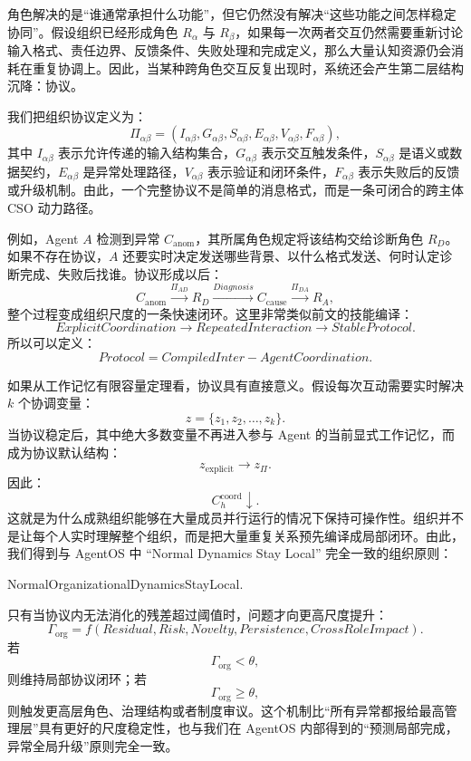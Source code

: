 角色解决的是“谁通常承担什么功能”，但它仍然没有解决“这些功能之间怎样稳定协同”。假设组织已经形成角色 $R_\alpha$ 与 $R_\beta$，如果每一次两者交互仍然需要重新讨论输入格式、责任边界、反馈条件、失败处理和完成定义，那么大量认知资源仍会消耗在重复协调上。因此，当某种跨角色交互反复出现时，系统还会产生第二层结构沉降：协议。

我们把组织协议定义为：
\[
\Pi_{\alpha\beta}
=
\left(
I_{\alpha\beta},
G_{\alpha\beta},
S_{\alpha\beta},
E_{\alpha\beta},
V_{\alpha\beta},
F_{\alpha\beta}
\right),
\]
其中 $I_{\alpha\beta}$ 表示允许传递的输入结构集合，$G_{\alpha\beta}$ 表示交互触发条件，$S_{\alpha\beta}$ 是语义或数据契约，$E_{\alpha\beta}$ 是异常处理路径，$V_{\alpha\beta}$ 表示验证和闭环条件，$F_{\alpha\beta}$ 表示失败后的反馈或升级机制。由此，一个完整协议不是简单的消息格式，而是一条可闭合的跨主体 CSO 动力路径。

例如，Agent $A$ 检测到异常 $C_{\mathrm{anom}}$，其所属角色规定将该结构交给诊断角色 $R_D$。如果不存在协议，$A$ 还要实时决定发送哪些背景、以什么格式发送、何时认定诊断完成、失败后找谁。协议形成以后：
\[
C_{\mathrm{anom}}
\xrightarrow{\Pi_{AD}}
R_D
\xrightarrow{Diagnosis}
C_{\mathrm{cause}}
\xrightarrow{\Pi_{DA}}
R_A,
\]
整个过程变成组织尺度的一条快速闭环。这里非常类似前文的技能编译：
\[
ExplicitCoordination
\rightarrow
RepeatedInteraction
\rightarrow
StableProtocol.
\]
所以可以定义：
\[
\boxed{
Protocol
=
CompiledInter-AgentCoordination.
}
\]

如果从工作记忆有限容量定理看，协议具有直接意义。假设每次互动需要实时解决 $k$ 个协调变量：
\[
z=\{z_1,z_2,\ldots,z_k\}.
\]
当协议稳定后，其中绝大多数变量不再进入参与 Agent 的当前显式工作记忆，而成为协议默认结构：
\[
z_{\mathrm{explicit}}
\rightarrow
z_{\Pi}.
\]
因此：
\[
C_h^{\mathrm{coord}}
\downarrow.
\]
这就是为什么成熟组织能够在大量成员并行运行的情况下保持可操作性。组织并不是让每个人实时理解整个组织，而是把大量重复关系预先编译成局部闭环。由此，我们得到与 AgentOS 中 ``Normal Dynamics Stay Local'' 完全一致的组织原则：
\begin{statementbox}
NormalOrganizationalDynamicsStayLocal.
\end{statementbox}
只有当协议内无法消化的残差超过阈值时，问题才向更高尺度提升：
\[
\Gamma_{\mathrm{org}}
=
f(
Residual,
Risk,
Novelty,
Persistence,
CrossRoleImpact
).
\]
若
\[
\Gamma_{\mathrm{org}}<\theta,
\]
则维持局部协议闭环；若
\[
\Gamma_{\mathrm{org}}\geq\theta,
\]
则触发更高层角色、治理结构或者制度审议。这个机制比“所有异常都报给最高管理层”具有更好的尺度稳定性，也与我们在 AgentOS 内部得到的“预测局部完成，异常全局升级”原则完全一致。

